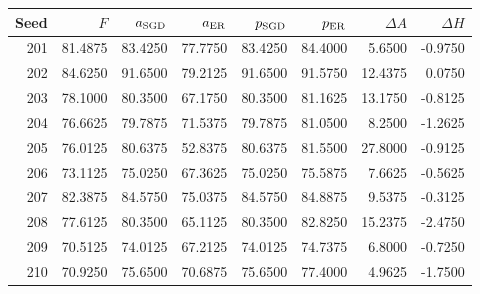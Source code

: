 \begin{tabular}{rrrrrrrr}
\toprule
Seed & $F$ & $a_{\rm SGD}$ & $a_{\rm ER}$ & $p_{\rm SGD}$ & $p_{\rm ER}$ & $\Delta A$ & $\Delta H$ \\
\midrule
201 & 81.4875 & 83.4250 & 77.7750 & 83.4250 & 84.4000 & 5.6500 & -0.9750 \\
202 & 84.6250 & 91.6500 & 79.2125 & 91.6500 & 91.5750 & 12.4375 & 0.0750 \\
203 & 78.1000 & 80.3500 & 67.1750 & 80.3500 & 81.1625 & 13.1750 & -0.8125 \\
204 & 76.6625 & 79.7875 & 71.5375 & 79.7875 & 81.0500 & 8.2500 & -1.2625 \\
205 & 76.0125 & 80.6375 & 52.8375 & 80.6375 & 81.5500 & 27.8000 & -0.9125 \\
206 & 73.1125 & 75.0250 & 67.3625 & 75.0250 & 75.5875 & 7.6625 & -0.5625 \\
207 & 82.3875 & 84.5750 & 75.0375 & 84.5750 & 84.8875 & 9.5375 & -0.3125 \\
208 & 77.6125 & 80.3500 & 65.1125 & 80.3500 & 82.8250 & 15.2375 & -2.4750 \\
209 & 70.5125 & 74.0125 & 67.2125 & 74.0125 & 74.7375 & 6.8000 & -0.7250 \\
210 & 70.9250 & 75.6500 & 70.6875 & 75.6500 & 77.4000 & 4.9625 & -1.7500 \\
\bottomrule
\end{tabular}
